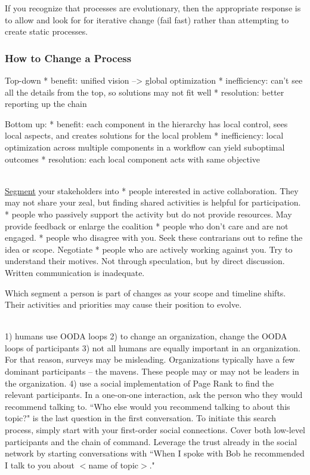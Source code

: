 If you recognize that processes are evolutionary, then the appropriate response is to allow and look for for iterative change (fail fast) rather than attempting to create static processes.

\subsubsection{How to Change a Process}
Top-down
* benefit: unified vision --> global optimization
* inefficiency: can't see all the details from the top, so solutions may not fit well
* resolution: better reporting up the chain

Bottom up:
* benefit: each component in the hierarchy has local control, sees local aspects, and creates solutions for the local problem
* inefficiency: local optimization across multiple components in a workflow can yield suboptimal outcomes
* resolution: each local component acts with same objective

\ \\

\href{https://en.wikipedia.org/wiki/Market_segmentation}{Segment} your stakeholders into 
* people interested in active collaboration. They may not share your zeal, but finding shared activities is helpful for participation.
* people who passively support the activity but do not provide resources. May provide feedback or enlarge the coalition
* people who don't care and are not engaged.
* people who disagree with you. Seek these contrarians out to refine the idea or scope. Negotiate
* people who are actively working against you. Try to understand their motives. Not through speculation, but by direct discussion. Written communication is inadequate. 

Which segment a person is part of changes as your scope and timeline shifts. Their activities and priorities may cause their position to evolve. 

\ \\

1) humans use OODA loops
2) to change an organization, change the OODA loops of participants
3) not all humans are equally important in an organization. For that reason, surveys may be misleading. Organizations typically have a few dominant participants -- the mavens. These people may or may not be leaders in the organization.
4) use a social implementation of Page Rank to find the relevant participants. In a one-on-one interaction, ask the person who they would recommend talking to.
``Who else would you recommend talking to about this topic?" is the last question in the first conversation.
To initiate this search process, simply start with your first-order social connections. Cover both low-level participants and the chain of command.
Leverage the trust already in the social network by starting conversations with ``When I spoke with Bob he recommended I talk to you about $<$name of topic$>$."





